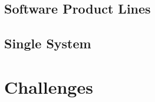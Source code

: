 \subsection{Software Product Lines}
\subsection{Single System}


%

\lessonslearned{
	\item \ldots
}{
	\item \ldots
}{
	\ldots
}

\sectionend

\section{Challenges}






